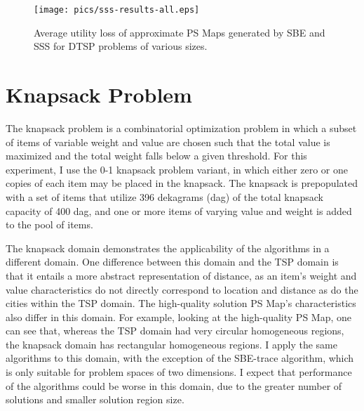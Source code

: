 \begin{figure}
\begin{center}
\texttt{[image: pics/sss-results-all.eps]}
\caption{Average utility loss of approximate PS Maps generated by SBE and SSS for DTSP problems of various sizes.}
\label{fig:sss-results-all}
\end{center}
\end{figure}









\section{Knapsack Problem}

The knapsack problem is a combinatorial optimization problem in which a subset of items of variable weight and value are chosen such that the total value is maximized and the total weight falls below  a given threshold.  For this experiment, I use the 0-1 knapsack problem variant, in which either zero or one copies of each item may be placed in the knapsack.  The knapsack is prepopulated with a set of items that utilize 396 dekagrams (dag) of the total knapsack capacity of 400 dag, and one or more items  of varying value and weight is added to the pool of items.

The knapsack domain demonstrates the applicability of the algorithms in a different domain.  One difference between this domain and the TSP domain is that it entails a more abstract representation of distance, as an item's  weight and value characteristics do not directly correspond to location and  distance as do the cities within the TSP domain. The high-quality solution PS Map's characteristics also differ in this domain.  For example, looking at the high-quality PS Map, one can see that, whereas the TSP domain had very circular homogeneous regions, the knapsack domain has rectangular homogeneous regions.  I apply the same algorithms to this domain, with the exception of the SBE-trace algorithm, which is only suitable for problem spaces of two dimensions.  I expect that performance of the algorithms could be worse in this domain, due to the greater number of solutions and smaller solution region size.



